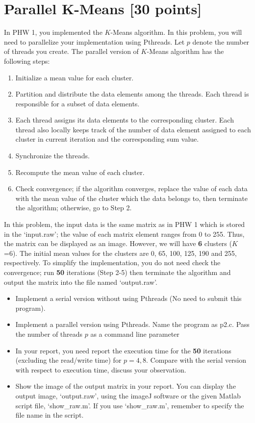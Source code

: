 \documentclass[times, 12pt]{article}
\begin{document}
\section{Parallel K-Means [30 points]}
In PHW 1, you implemented the $K$-Means algorithm. In this problem, you will need to parallelize your implementation using Pthreads. Let $p$ denote the number of threads you create. The parallel version of $K$-Means algorithm has the following steps:
\begin{enumerate}
\item Initialize a mean value for each cluster.
\item Partition and distribute the data elements among the threads. Each thread is responsible for a subset of data elements.
\item Each thread assigns its data elements to the corresponding cluster. Each thread also locally keeps track of the number of data element assigned to each cluster in current iteration and the corresponding sum value.
\item Synchronize the threads.
\item Recompute the mean value of each cluster. 
\item Check convergence; if the algorithm converges, replace the value of each data with the mean value of the cluster which the data belongs to, then terminate the algorithm; otherwise, go to Step 2. 
\end{enumerate}

In this problem, the input data is the same matrix as in PHW 1 which is stored in the `input.raw'; the value of each matrix element ranges from 0 to 255. Thus, the matrix can be displayed as an image. However, we will have \textbf{6} clusters ($K$=6). The initial mean values for the clusters are 0, 65, 100, 125, 190 and 255, respectively. To simplify the implementation, you do not need check the convergence; run \textbf{50} iterations (Step 2-5) then terminate the algorithm and output the matrix into the file named `output.raw'. 

\begin{itemize}	
\item Implement a serial version without using Pthreads (No need to submit this program).	
\item Implement a parallel version using Pthreads. Name the program as p2.c. Pass the number of threads $p$ as a command line parameter 
\item In your report, you need report the execution time for the \textbf{50} iterations (excluding the read/write time) for $p=4,8$. Compare with the serial version with respect to execution time, discuss your observation. 
\item Show the image of the output matrix in your report. 
You can display the output image, `output.raw', using the imageJ \cite{imageJ} software or the given Matlab script file, `show\_raw.m'. If you use `show\_raw.m', remember to specify the file name in the script. 		
\end{itemize}
\end{document}
